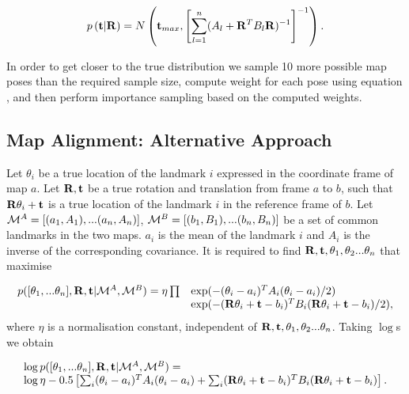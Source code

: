 \begin{equation}
 p \left( {\bf t}|{\bf R} \right) = N \left({\bf t}_{max},\left[ \sum_{l=1}^{n}( A_l + {\bf R}^TB_l{\bf R})^{-1}
  \right] ^{-1} \right).
\end{equation}

In order to get closer to the true distribution we sample 10 more
possible map poses than the required sample size, compute weight for
each pose using equation ,
and then perform importance sampling based on the computed weights.


\subsection{Map Alignment: Alternative Approach}


Let $\theta_i$ be a true location of the landmark $i$ expressed in the
coordinate frame of map $a$. Let ${\bf R,t}$ be a true rotation and
translation from frame $a$ to $b$, such that ${\bf R}\theta_i + {\bf
t}$ is a true location of the landmark $i$ in the reference frame of
$b$. Let $\mapA=[(a_1,A_1),...(a_n,A_n)]$,
$\mapB=[(b_1,B_1),...(b_n,B_n)]$ be a set of common landmarks in the
two maps. $a_i$ is the mean of the landmark $i$ and $A_i$ is the
inverse of the corresponding covariance. It is required to find ${\bf
R,t},\theta_1, \theta_2 ...\theta_n$ that maximise

\begin{equation}
\begin{array}{ll}
p([\theta_1, ...\theta_n],{\bf R},{\bf t} | \mapA, \mapB) =
 \eta \prod& \exp(-(\theta_i - a_i)^T A_i (\theta_i - a_i)/2)\\
&\exp(-({\bf R}\theta_i + {\bf t} - b_i)^T B_i
({\bf R}\theta_i + {\bf t} - b_i)/2),
\label{eqn:align_w0}
\end{array}
\end{equation}
where $\eta$ is a normalisation constant, independent of ${\bf
R,t},\theta_1, \theta_2 ...\theta_n$. Taking $\log$s we obtain

\begin{equation}
\begin{array}{l}
\log p([\theta_1, ...\theta_n],{\bf R},{\bf t} | \mapA, \mapB) =\\
\log\eta - 0.5 \left[
\sum_i (\theta_i - a_i)^T A_i (\theta_i - a_i) +
\sum_i ({\bf R}\theta_i + {\bf t} - b_i)^T B_i({\bf R}\theta_i + {\bf t} - b_i)
\right].
\end{array}
\label{eqn:align_log_prob}
\end{equation}

